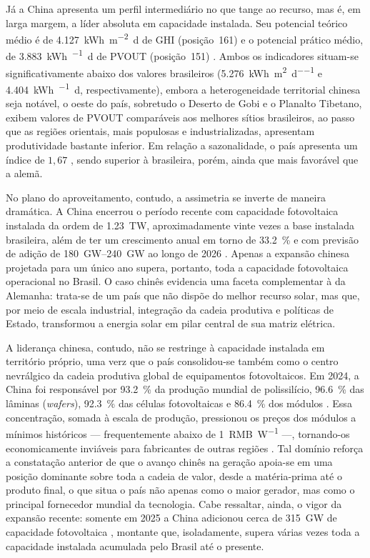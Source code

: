 Já a China apresenta um perfil intermediário no que tange ao recurso, mas é, em
larga margem, a líder absoluta em capacidade instalada. Seu potencial teórico
médio é de \SI{4,127}{\kWh\per\square\metre\day} de GHI (posição~161) e o
potencial prático médio, de \SI{3,883}{\kWh\per\kWp\day} de PVOUT
(posição~151) \cite{WorldBank2020}. Ambos os indicadores situam-se
significativamente abaixo dos valores brasileiros
(\SI{5,276}{\kWh\per\square\metre\per\day} e
\SI{4,404}{\kWh\per\kWp\day}, respectivamente), embora a heterogeneidade
territorial chinesa seja notável, o oeste do país, sobretudo o Deserto de Gobi e o Planalto Tibetano, exibem valores de PVOUT comparáveis aos melhores sítios brasileiros,
ao passo que as regiões orientais, mais populosas e industrializadas,
apresentam produtividade bastante inferior. Em relação a sazonalidade, o país apresenta um índice de $1{,}67$ \cite{WorldBank2020}, sendo superior à brasileira, porém, ainda que
mais favorável que a alemã.

No plano do aproveitamento, contudo, a assimetria se inverte de maneira
dramática. A China encerrou o período recente com capacidade fotovoltaica
instalada da ordem de \SI{1,23}{\tera\watt}, aproximadamente vinte vezes a
base instalada brasileira, além de ter um crescimento anual em torno de
\SI{33,2}{\percent} e com previsão de adição de \SIrange{180}{240}{\giga\watt}
ao longo de 2026 \cite{nea2026}. Apenas a expansão chinesa projetada para um
único ano supera, portanto, toda a capacidade fotovoltaica operacional no Brasil. O caso chinês evidencia uma faceta complementar à da Alemanha: trata-se de um país que não dispõe do melhor recurso solar, mas que, por meio de escala industrial, integração da cadeia produtiva e políticas de Estado, transformou a energia solar em pilar central de sua matriz elétrica.

A liderança chinesa, contudo, não se restringe à capacidade instalada em
território próprio, uma verz que o país consolidou-se também como o centro nevrálgico da
cadeia produtiva global de equipamentos fotovoltaicos. Em 2024, a China foi
responsável por \SI{93,2}{\percent} da produção mundial de polissilício,
\SI{96,6}{\percent} das lâminas (\textit{wafers}), \SI{92,3}{\percent} das
células fotovoltaicas e \SI{86,4}{\percent} dos módulos \cite{Davidson2026}.
Essa concentração, somada à escala de produção, pressionou os preços dos módulos
a mínimos históricos --- frequentemente abaixo de \SI{1}{RMB\per\watt} ---,
tornando-os economicamente inviáveis para fabricantes de outras regiões
\cite{Davidson2026}. Tal domínio reforça a constatação anterior de que o avanço
chinês na geração apoia-se em uma posição dominante sobre toda a cadeia de valor,
desde a matéria-prima até o produto final, o que situa o país não apenas como o
maior gerador, mas como o principal fornecedor mundial da tecnologia. Cabe
ressaltar, ainda, o vigor da expansão recente: somente em 2025 a China adicionou
cerca de \SI{315}{\giga\watt} de capacidade fotovoltaica \cite{PVMagazine2026},
montante que, isoladamente, supera várias vezes toda a capacidade instalada
acumulada pelo Brasil até o presente.

